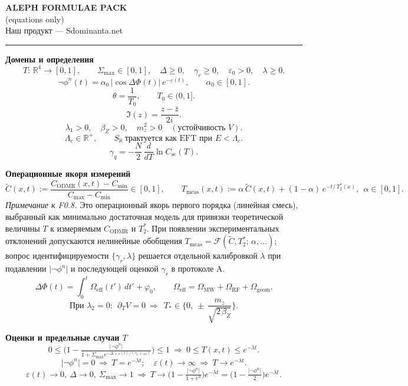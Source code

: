 \documentclass[a4paper,12pt]{article}
\newcommand{\productline}{Наш продукт — Sdominanta.net}
\newcommand{\productline}{Наш продукт — {\symbolsfont\symbol{"1F704}}\,Sdominanta.net\,{\symbolsfont\symbol{"1F701}\,\symbol{"1F702}}}
\begin{document}
\begin{center}
{\Large \bf ALEPH FORMULAE PACK}\\[2pt]
{\normalsize (equations only)}\\[4pt]
{\small \productline}
\end{center}
\vspace{0.5em}
\hrule
\vspace{0.75em}

\noindent\textbf{Домены и определения}\\[-0.25em]
\[
T:\,\mathbb{R}^{4}\to [0,1],\qquad \Sigma_{\max}\in[0,1],\quad \Delta\ge 0,\quad \gamma_{r}\ge 0,\quad \varepsilon_{0}>0,\quad \lambda\ge 0.\tag{F0.1}
\]
\[
\neg\phi^{n}(t)=\alpha_{0}\,\lvert\cos\Delta\Phi(t)\rvert\,e^{-\varepsilon(t)},\qquad \alpha_{0}\in[0,1].\tag{F0.2}
\]
\[
\theta=\frac{1}{T_{0}},\qquad T_{0}\in(0,1].\tag{F0.3}
\]
\[
\Im(z)=\frac{z-\bar z}{2i}.\tag{F0.4}
\]
\[
\lambda_{1}>0,\quad \beta_{Z}>0,\quad m_{z}^{2}>0\quad (\text{устойчивость } V).\tag{F0.5}
\]
\[
\Lambda_{c}\in\mathbb{R}^{+},\qquad S_{\aleph}\ \text{трактуется как EFT при } E<\Lambda_{c}.\tag{F0.6}
\]
\[
\gamma_{q}= -\frac{N}{2}\,\frac{d}{dT}\ln C_{\mathrm{se}}(T).\tag{F0.7}
\]

\noindent\textbf{Операционные якоря измерений}\\[-0.25em]
\[
\tilde C(x,t):=\frac{C_{\mathrm{ODMR}}(x,t)-C_{\min}}{C_{\max}-C_{\min}}\in[0,1],\qquad
T_{\mathrm{meas}}(x,t):=\alpha\,\tilde C(x,t)+(1-\alpha)\,e^{-t/\,T_{2}^{*}(x)},\ \ \alpha\in[0,1].\tag{F0.8}
\]
\noindent\textit{Примечание к F0.8.} Это операционный якорь первого порядка (линейная смесь), выбранный как минимально достаточная модель для привязки теоретической величины $T$ к измеряемым $C_{\mathrm{ODMR}}$ и $T_{2}^{*}$. При появлении экспериментальных отклонений допускаются нелинейные обобщения $T_{\mathrm{meas}}=\mathcal{F}(\tilde C, T_{2}^{*};\,\alpha,\dots)$; вопрос идентифицируемости $\{\gamma_{r},\lambda\}$ решается отдельной калибровкой $\lambda$ при подавлении $\lvert\neg\phi^{n}\rvert$ и последующей оценкой $\gamma_{r}$ в протоколе A.
\[
\Delta\Phi(t)=\int_{0}^{t}\Omega_{\mathrm{eff}}(t')\,dt'+\varphi_{0},\qquad
\Omega_{\mathrm{eff}}=\Omega_{\mathrm{MW}}+\Omega_{\mathrm{RF}}+\Omega_{\mathrm{geom}}.\tag{F0.9}
\]
\[
\text{При }\lambda_{2}=0:\ \ \partial_{T}V=0\ \Rightarrow\ \ T_{*}\in\Big\{0,\ \pm\,\frac{m_{z}}{\sqrt{2\,\beta_{Z}}}\Big\}.\tag{F0.10}
\]

\noindent\textbf{Оценки и предельные случаи $T$}\\[-0.25em]
\[
0\le \Big(1-\tfrac{\lvert\neg\phi^{n}\rvert}{1+\Sigma_{\max} e^{-\Delta+\varepsilon(t)/(\gamma_{r}+\varepsilon_{0})}}\Big)\le 1\ \Rightarrow\ 0\le T(x,t)\le e^{-\lambda t}.\tag{F0.11}
\]
\[
\lvert\neg\phi^{n}\rvert=0\ \Rightarrow\ T=e^{-\lambda t};\quad \varepsilon(t)\to\infty\ \Rightarrow\ T\to e^{-\lambda t}.\tag{F0.12}
\]
\[
\varepsilon(t)\to 0,\ \Delta\to 0,\ \Sigma_{\max}\to 1\ \Rightarrow\ T\to \Big(1-\tfrac{\lvert\neg\phi^{n}\rvert}{1+e^{0}}\Big)e^{-\lambda t}=\Big(1-\tfrac{\lvert\neg\phi^{n}\rvert}{2}\Big)e^{-\lambda t}.\tag{F0.13}
\]
\end{document}
